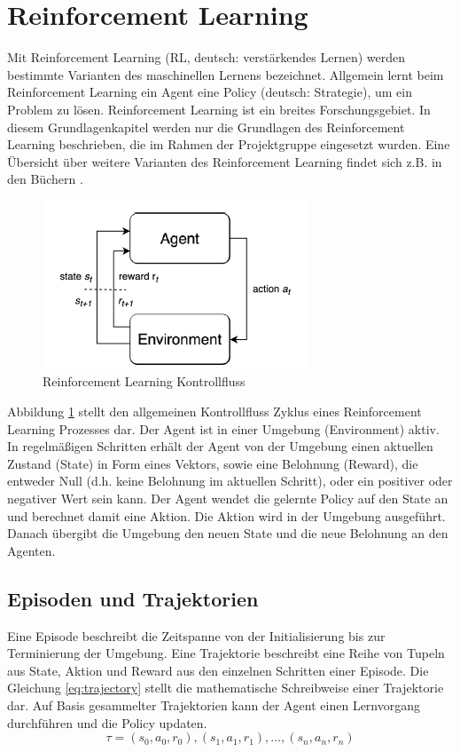 \section{Reinforcement Learning}
Mit Reinforcement Learning (RL, deutsch: verstärkendes Lernen) werden bestimmte Varianten des maschinellen Lernens bezeichnet. Allgemein lernt beim Reinforcement Learning ein Agent eine Policy (deutsch: Strategie), um ein Problem zu lösen. Reinforcement Learning ist ein breites Forschungsgebiet. In diesem Grundlagenkapitel werden nur die Grundlagen des Reinforcement Learning beschrieben, die im Rahmen der Projektgruppe eingesetzt wurden. Eine Übersicht über weitere Varianten des Reinforcement Learning findet sich z.B. in den Büchern \cite{FoundationsDeepRL}\cite{deepRL-2020}.\newline
\begin{figure}
    \centering
    \includegraphics{resources/img/Reinforcement_Learning/RL Control Loop.png}
    \caption{Reinforcement Learning Kontrollfluss \cite{FoundationsDeepRL}}
    \label{fig:rl_control_loop}
\end{figure}
\noindent Abbildung \ref{fig:rl_control_loop} stellt den allgemeinen Kontrollfluss Zyklus eines Reinforcement Learning Prozesses dar. Der Agent ist in einer Umgebung (Environment) aktiv. In regelmäßigen Schritten erhält der Agent von der Umgebung einen aktuellen Zustand (State) in Form eines Vektors, sowie eine Belohnung (Reward), die entweder Null (d.h. keine Belohnung im aktuellen Schritt), oder ein positiver oder negativer Wert sein kann. Der Agent wendet die gelernte Policy auf den State an und berechnet damit eine Aktion. Die Aktion wird in der Umgebung ausgeführt. Danach übergibt die Umgebung den neuen State und die neue Belohnung an den Agenten.\cite{FoundationsDeepRL}

\subsection{Episoden und Trajektorien}
Eine Episode beschreibt die Zeitspanne von der Initialisierung bis zur Terminierung der Umgebung. Eine Trajektorie beschreibt eine Reihe von Tupeln aus State, Aktion und Reward aus den einzelnen Schritten einer Episode. Die Gleichung \ref{eq:trajectory} stellt die mathematische Schreibweise einer Trajektorie dar. Auf Basis gesammelter Trajektorien kann der Agent einen Lernvorgang durchführen und die Policy updaten.\cite{FoundationsDeepRL}
\begin{equation}
    \tau = (s_0,a_0,r_0), (s_1,a_1,r_1), \dots, (s_n,a_n,r_n)
    \label{eq:trajectory}
\end{equation}

